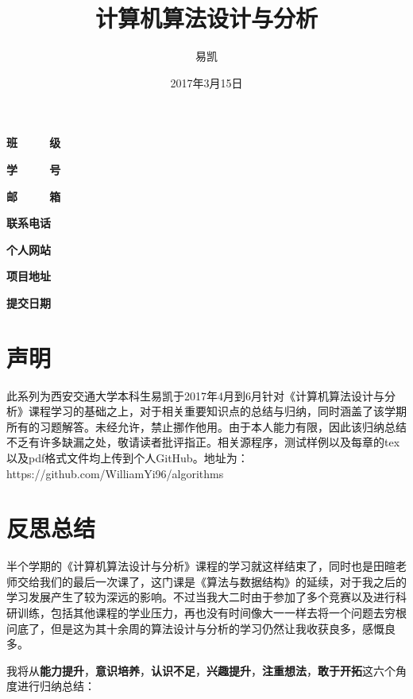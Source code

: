 \documentclass[UTF8]{ctexart}
\title{\Huge{计算机算法设计与分析}}
\author{\Huge{易凯}}
\date{\Huge{2017年3月15日}}
\begin{document}
    \maketitle
    \vspace{35mm}
    \begin{flushright}
    \Large{
    \textbf{班\ \ \ \ \ 级} 

    \textbf{学\ \ \ \ \ 号} 

    \textbf{邮\ \ \ \ \ 箱} 

    \textbf{联系电话} 

    \textbf{个人网站} 


    \textbf{项目地址} 

    \textbf{提交日期} 
    }
    \end{flushright}

    \newpage

    \section{声明}
    此系列为西安交通大学本科生易凯于2017年4月到6月针对《计算机算法设计与分析》课程学习的基础之上，对于相关重要知识点的总结与归纳，同时涵盖了该学期所有的习题解答。未经允许，禁止挪作他用。由于本人能力有限，因此该归纳总结不乏有许多缺漏之处，敬请读者批评指正。相关源程序，测试样例以及每章的tex以及pdf格式文件均上传到个人GitHub。地址为：https://github.com/WilliamYi96/algorithms

    \newpage
    \section{反思总结}
    半个学期的《计算机算法设计与分析》课程的学习就这样结束了，同时也是田暄老师交给我们的最后一次课了，这门课是《算法与数据结构》的延续，对于我之后的学习发展产生了较为深远的影响。不过当我大二时由于参加了多个竞赛以及进行科研训练，包括其他课程的学业压力，再也没有时间像大一一样去将一个问题去穷根问底了，但是这为其十余周的算法设计与分析的学习仍然让我收获良多，感慨良多。

   	我将从\textbf{能力提升}，\textbf{意识培养}，\textbf{认识不足}，\textbf{兴趣提升}，\textbf{注重想法}，\textbf{敢于开拓}这六个角度进行归纳总结：
\end{document}
